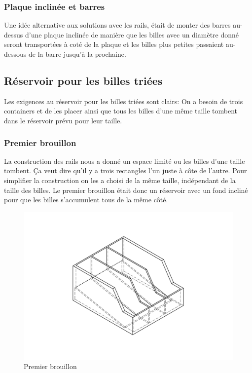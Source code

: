 
\subsubsection{Plaque inclinée et barres}
Une idée alternative aux solutions avec les rails, était de monter des barres au-dessus d'une plaque inclinée de manière que les billes avec un diamètre donné seront transportées à coté de la plaque et les billes plus petites passaient au-dessous de la barre jusqu'à la prochaine.


\subsection{Réservoir pour les billes triées}
Les exigences au réservoir pour les billes triées sont clairs: On a besoin de trois containers et de les placer ainsi que tous les billes d'une même taille tombent dans le réservoir prévu pour leur taille. 

\subsubsection{Premier brouillon}
La construction des rails nous a donné un espace limité ou les billes d'une taille tombent. Ça veut dire qu'il y a trois rectangles l'un juste à côte de l'autre. Pour simplifier la construction on les a choisi de la même taille, indépendant de la taille des billes. Le premier brouillon était donc un réservoir avec un fond incliné pour que les billes s'accumulent tous de la même côté. 

\begin{figure}
    \centering
    \includegraphics[width=\textwidth]{Graphics/PREMIER_BROUILLON.pdf}
    \caption{Premier brouillon}
\end{figure}


